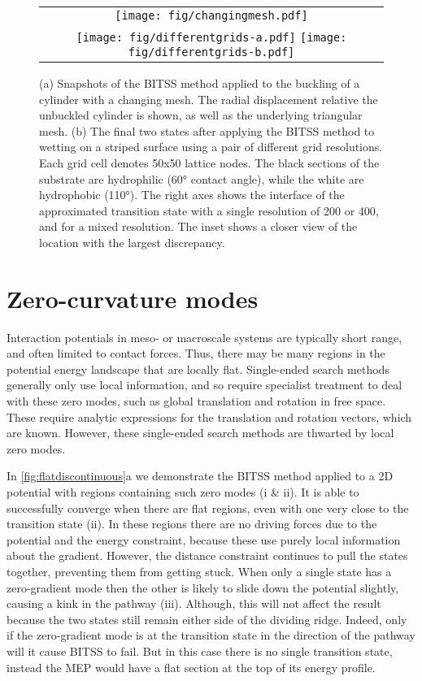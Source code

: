 \documentclass[aps,twocolumn]{revtex4}
\begin{document}
\begin{figure}[htb]
  \centering
  \begin{tabular}[b]{c}
    \texttt{[image: fig/changingmesh.pdf]}\\
    \texttt{[image: fig/differentgrids-a.pdf]}%
    \texttt{[image: fig/differentgrids-b.pdf]}%
  \end{tabular}
  \caption{
  (a) Snapshots of the BITSS method applied to the buckling of a cylinder with a changing mesh. The radial displacement relative the unbuckled cylinder is shown, as well as the underlying triangular mesh.
  (b) The final two states after applying the BITSS method to wetting on a striped surface using a pair of different grid resolutions. Each grid cell denotes 50x50 lattice nodes. The black sections of the substrate are hydrophilic (60\si{\degree} contact angle), while the white are hydrophobic (110\si{\degree}). The right axes shows the interface of the approximated transition state with a single resolution of 200 or 400, and for a mixed resolution. The inset shows a closer view of the location with the largest discrepancy.}
  \label{fig:differentgrids}
\end{figure}


\section{Zero-curvature modes}
Interaction potentials in meso- or macroscale systems are typically short range, and often limited to contact forces. Thus, there may be many regions in the potential energy landscape that are locally flat. Single-ended search methods generally only use local information, and so require specialist treatment to deal with these zero modes, such as global translation and rotation in free space. These require analytic expressions for the translation and rotation vectors, which are known. However, these single-ended search methods are thwarted by local zero modes.

In \cref{fig:flatdiscontinuous}a we demonstrate the BITSS method applied to a 2D potential with regions containing such zero modes (i \& ii). It is able to successfully converge when there are flat regions, even with one very close to the transition state (ii). In these regions there are no driving forces due to the potential and the energy constraint, because these use purely local information about the gradient. However, the distance constraint continues to pull the states together, preventing them from getting stuck. When only a single state has a zero-gradient mode then the other is likely to slide down the potential slightly, causing a kink in the pathway (iii). Although, this will not affect the result because the two states still remain either side of the dividing ridge. Indeed, only if the zero-gradient mode is at the transition state in the direction of the pathway will it cause BITSS to fail. But in this case there is no single transition state, instead the MEP would have a flat section at the top of its energy profile. 
\end{document}
